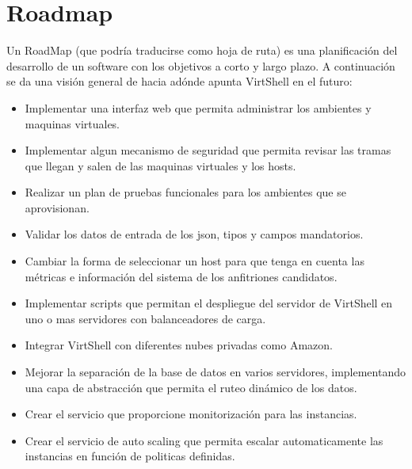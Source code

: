 
\chapter{Roadmap}
\label{roadmap}

Un RoadMap (que podría traducirse como hoja de ruta) es una planificación del desarrollo de un software con los objetivos a corto y largo plazo. A continuación se da una visión general de hacia adónde apunta VirtShell en el futuro:

\begin{itemize}
\item Implementar una interfaz web que permita administrar los ambientes y maquinas virtuales.
\item Implementar algun mecanismo de seguridad que permita revisar las tramas que llegan y salen de las maquinas virtuales y los hosts.
\item Realizar un plan de pruebas funcionales para los ambientes que se aprovisionan.
\item Validar los datos de entrada de los json, tipos y campos mandatorios.
\item Cambiar la forma de seleccionar un host para que tenga en cuenta las métricas e información del sistema de los anfitriones candidatos.
\item Implementar scripts que permitan el despliegue del servidor de VirtShell en uno o mas servidores con balanceadores de carga.
\item Integrar VirtShell con diferentes nubes privadas como Amazon.
\item Mejorar la separación de la base de datos en varios servidores, implementando una capa de abstracción que permita el ruteo dinámico de los datos.
\item Crear el servicio que proporcione monitorización para las instancias.
\item Crear el servicio de auto scaling que permita escalar automaticamente las instancias en función de politicas definidas.
\end{itemize}
        